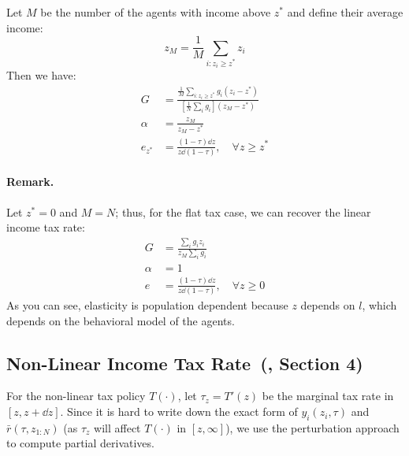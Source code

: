 Let $M$ be the number of the agents with income above $z^*$ and define their average income:
\begin{equation*}
    z_M = \frac{1}{M}\sum_{i:z_i\geq z^*} z_i
\end{equation*}
Then we have:
\begin{align*}
    G &= \frac{\frac{1}{M}\sum_{i:z_i\geq z^*} g_i(z_i-z^*)}{\left [\frac{1}{N}\sum_i g_i\right ] (z_M-z^*)} \\
    \alpha &= \frac{z_M}{z_M-z^*} \\
    e_{z^*} &= \frac{(1-\tau)\dd z}{z\dd(1-\tau)}, \quad \forall z \geq z^*
\end{align*}

\paragraph{Remark.} Let $z^*=0$ and $M=N$; thus, for the flat tax case, we can recover the linear income tax rate:
\begin{align*}
    G &= \frac{\sum_{i} g_i z_i}{z_M\sum_i g_i} \\
    \alpha &= 1 \\
    e &= \frac{(1-\tau)\dd z}{z\dd(1-\tau)}, \quad \forall z \geq 0
\end{align*}
As you can see, elasticity is population dependent because $z$ depends on $l$, which depends on the behavioral model of the agents.

\subsection{Non-Linear Income Tax Rate~(\citet{saez2001using}, Section 4)}
For the non-linear tax policy $T(\cdot)$, let $\tau_z=T'(z)$ be the marginal tax rate in $[z,z+\dd z]$. Since it is hard to write down the exact form of $y_i(z_i, \tau)$ and $\bar{r}(\tau, z_{1:N})$ (as $\tau_z$ will affect $T(\cdot)$ in $[z,\infty]$), we use the perturbation approach to compute partial derivatives. 

